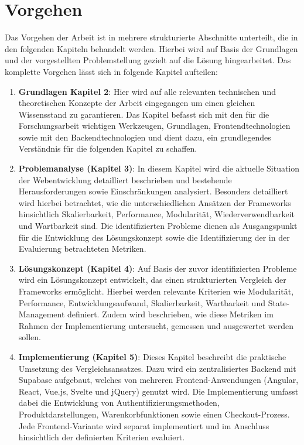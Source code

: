 \documentclass[oneside]{ausarbeitung}
\begin{document}
\section{Vorgehen}
\label{sec:vorgehen}

Das Vorgehen der Arbeit ist in mehrere strukturierte Abschnitte unterteilt, die in den folgenden Kapiteln behandelt werden. Hierbei wird auf Basis der Grundlagen und der vorgestellten Problemstellung gezielt auf die Lösung hingearbeitet. 
Das komplette Vorgehen lässt sich in folgende Kapitel aufteilen: 

\begin{enumerate}  
\item \textbf{Grundlagen Kapitel 2}: Hier wird auf alle relevanten technischen und theoretischen Konzepte der Arbeit eingegangen um einen gleichen Wissensstand zu garantieren. Das Kapitel befasst sich mit den für die Forschungsarbeit wichtigen Werkzeugen, Grundlagen, Frontendtechnologien sowie mit den Backendtechnologien und dient dazu, ein grundlegendes Verständnis für die folgenden Kapitel zu schaffen. 
    
\item \textbf{Problemanalyse (Kapitel 3)}: In diesem Kapitel wird die aktuelle Situation der Webentwicklung detailliert beschrieben und bestehende Herausforderungen sowie Einschränkungen analysiert. Besonders detailliert wird hierbei betrachtet, wie die unterschiedlichen Ansätzen der Frameworks hinsichtlich Skalierbarkeit, Performance, Modularität, Wiederverwendbarkeit und Wartbarkeit sind. Die identifizierten Probleme dienen als Ausgangspunkt für die Entwicklung des Lösungskonzept sowie die Identifizierung der in der Evaluierung betrachteten Metriken.

\item \textbf{Lösungskonzept (Kapitel 4)}: Auf Basis der zuvor identifizierten Probleme wird ein Lösungskonzept entwickelt, das einen strukturierten Vergleich der Frameworks ermöglicht. Hierbei werden relevante Kriterien wie Modularität, Performance, Entwicklungsaufwand, Skalierbarkeit, Wartbarkeit und State-Management definiert. Zudem wird beschrieben, wie diese Metriken im Rahmen der Implementierung untersucht, gemessen und ausgewertet werden sollen.

\item \textbf{Implementierung (Kapitel 5)}: Dieses Kapitel beschreibt die praktische Umsetzung des Vergleichsansatzes. Dazu wird ein zentralisiertes Backend mit Supabase aufgebaut, welches von mehreren Frontend-Anwendungen (Angular, React, Vue.js, Svelte und jQuery) genutzt wird. Die Implementierung umfasst dabei die Entwicklung von Authentifizierungsmethoden, Produktdarstellungen, Warenkorbfunktionen sowie einen Checkout-Prozess. Jede Frontend-Variante wird separat implementiert und im Anschluss hinsichtlich der definierten Kriterien evaluiert.


\end{enumerate}
\end{document}
